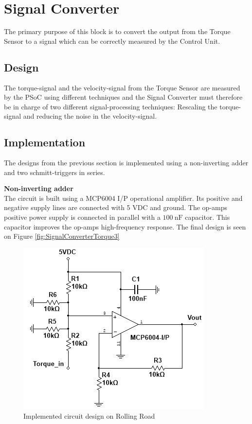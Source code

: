 \newpage
\section{Signal Converter}
The primary purpose of this block is to convert the output from the Torque Sensor to a signal which can be correctly measured by the Control Unit.

\subsection{Design}
The torque-signal and the velocity-signal from the Torque Sensor are measured by the PSoC using different techniques and the Signal Converter must therefore be in charge of two different signal-processing techniques: Rescaling the torque-signal and reducing the noise in the velocity-signal.




\subsection{Implementation}
The designs from the previous section is implemented using a non-inverting adder and two schmitt-triggers in series.

\textbf{Non-inverting adder}\\
The circuit is built using a MCP6004 I/P operational amplifier. Its positive and negative supply lines are connected with 5 VDC and ground. The op-amps positive power supply is connected in parallel with a $\SI{100}{\nano \farad}$ capacitor. This capacitor improves the op-amps high-frequency response. The final design is seen on Figure \vref{fig:SignalConverterTorque3}

\begin{figure}[H]
	\centering
	\includegraphics[width=0.4\linewidth]{Hardware/SignalConverter/TorqueDesign3}
	\caption{Implemented circuit design on Rolling Road}
	\label{fig:SignalConverterTorque3}
\end{figure}

